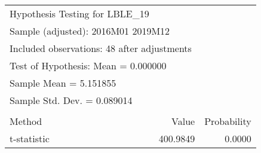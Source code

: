 \begin{tabular}{lrrr}
\toprule
\multicolumn{2}{l}{Hypothesis Testing for LBLE\_19}&\multicolumn{1}{c}{}&\multicolumn{1}{c}{}\\
\multicolumn{3}{l}{Sample (adjusted): 2016M01 2019M12}&\multicolumn{1}{c}{}\\
\multicolumn{3}{l}{Included observations: 48 after adjustments}&\multicolumn{1}{c}{}\\
\multicolumn{3}{l}{Test of Hypothesis: Mean =  0.000000}&\multicolumn{1}{c}{}\\
\midrule
\multicolumn{2}{l}{Sample Mean =  5.151855}&\multicolumn{1}{c}{}&\multicolumn{1}{c}{}\\
\multicolumn{2}{l}{Sample Std. Dev. =  0.089014}&\multicolumn{1}{c}{}&\multicolumn{1}{c}{}\\
\multicolumn{1}{c}{}&\multicolumn{1}{c}{}&\multicolumn{1}{c}{}&\multicolumn{1}{c}{}\\
\multicolumn{1}{l}{Method}&\multicolumn{1}{c}{}&\multicolumn{1}{r}{Value}&\multicolumn{1}{r}{Probability}\\
\multicolumn{1}{l}{t-statistic}&\multicolumn{1}{c}{}&\multicolumn{1}{r}{400.9849}&\multicolumn{1}{r}{0.0000}\\
\bottomrule
\end{tabular}